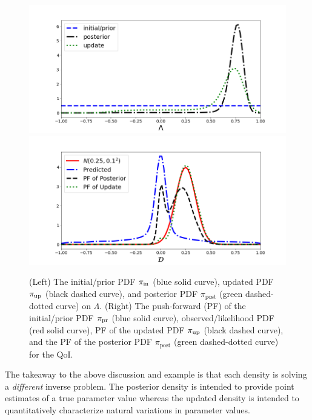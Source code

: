 \begin{ex}
%


\begin{figure}[htbp]
\centering
   \includegraphics[width=0.49\linewidth]{figures/bip-vs-sip-1.png}
   \includegraphics[width=0.49\linewidth]{figures/bip-vs-sip-pf-1.png}
 \caption{(Left) The initial/prior PDF $\operatorname*{\pi_{in}}$ (blue solid curve), updated PDF $\operatorname*{\pi_{up}}$ (black dashed curve), and posterior PDF $\pi_\text{post}$ (green dashed-dotted curve) on $\Lambda$.
 (Right) The push-forward (PF) of the initial/prior PDF $\operatorname*{\pi_{pr}}$ (blue solid curve), observed/likelihood PDF (red solid curve), PF of the updated PDF $\operatorname*{\pi_{up}}$ (black dashed curve), and the PF of the posterior PDF $\pi_\text{post}$ (green dashed-dotted curve) for the QoI.}
 \label{fig:bayes-comparison}
\end{figure}

The takeaway to the above discussion and example is that each density is solving a {\em different} inverse problem.
The posterior density is intended to provide point estimates of a true parameter value whereas the updated density is intended to quantitatively characterize natural variations in parameter values.

\end{ex}

